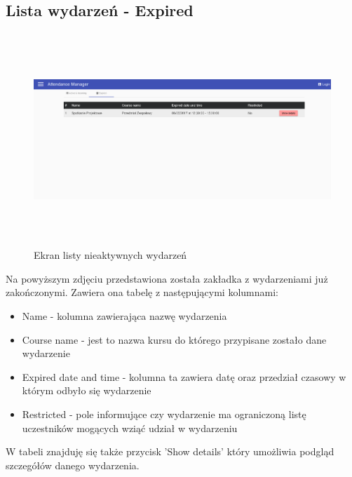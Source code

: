 \subsection{Lista wydarzeń - Expired}
\begin{figure}[h!]
\centering
\includegraphics[height=8cm,width=15cm]{images/EventsListExpired}
\caption{Ekran listy nieaktywnych wydarzeń}
\label{fig:EventListExpired}
\end{figure}
Na powyższym zdjęciu przedstawiona została zakładka z wydarzeniami już zakończonymi. Zawiera ona tabelę z następującymi kolumnami:
\begin{itemize}
    \item Name - kolumna zawierająca nazwę wydarzenia
    \item Course name - jest to nazwa kursu do którego przypisane zostało dane wydarzenie
    \item Expired date and time - kolumna ta zawiera datę oraz przedział czasowy w którym odbyło się wydarzenie
    \item Restricted - pole informujące czy wydarzenie ma ograniczoną listę uczestników mogących wziąć udział w wydarzeniu
\end{itemize}
W tabeli znajduję się także przycisk 'Show details' który umożliwia podgląd szczegółów danego wydarzenia.

